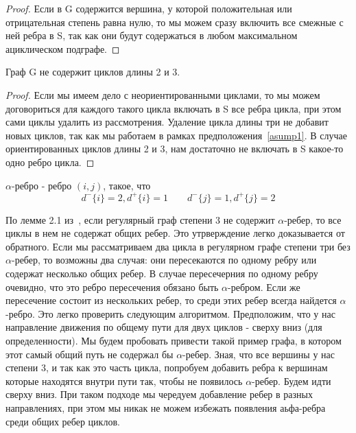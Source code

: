 \begin{proof}
    Если в G содержится вершина, у которой положительная или отрицательная
    степень равна нулю, то мы можем сразу включить все смежные с ней ребра 
    в S, так как они будут содержаться в любом максимальном ациклическом
    подграфе.
\end{proof}

\begin{assumption}\label{asump2}
    Граф G не содержит циклов длины 2 и 3.
\end{assumption}

\begin{proof}
    Если мы имеем дело с неориентированными циклами, то мы можем договориться
    для каждого такого цикла включать в S все ребра цикла, при этом
    сами циклы удалить из рассмотрения. Удаление цикла длины три не добавит
    новых циклов, так как мы работаем в рамках предположения~\ref{asump1}.
    В случае ориентированных циклов длины 2 и 3, нам достаточно не включать в S 
    какое-то одно ребро цикла.
\end{proof}

\begin{definition}
    $\alpha$-ребро - ребро $(i,j)$, такое, что 
    $$d^-\{i\} = 2, d^+\{i\}=1 \qquad d^-\{j\} = 1, d^+\{j\}=2$$
\end{definition}

По лемме 2.1 из~\cite{digraph_3}, если регулярный граф степени 3 не содержит
$\alpha$-ребер, то все циклы в нем не содержат общих ребер. Это утрверждение
легко доказывается от обратного. Если мы рассматриваем два цикла в регулярном 
графе степени три без $\alpha$-ребер, то возможны два случая: они пересекаются
по одному ребру или содержат несколько общих ребер. В случае пересечерния по 
одному ребру очевидно, что это ребро пересечения обязано быть $\alpha$-ребром.
Если же пересечение состоит из нескольких ребер, то среди этих ребер всегда 
найдется $\alpha$-ребро. Это легко проверить следующим алгоритмом. Предположим,
что у нас направление движения по общему пути для двух циклов - сверху вниз
(для определенности). Мы будем пробовать привести такой пример графа, в котором
этот самый общий путь не содержал бы $\alpha$-ребер. Зная, что все вершины 
у нас степени 3, и так как это часть цикла, попробуем добавить ребра к вершинам
которые находятся внутри пути так, чтобы не появилось $\alpha$-ребер. Будем 
идти сверху вниз. При таком подходе мы чередуем добавление ребер в разных 
направлениях, при этом мы никак не можем избежать появления аьфа-ребра среди
общих ребер циклов. 

